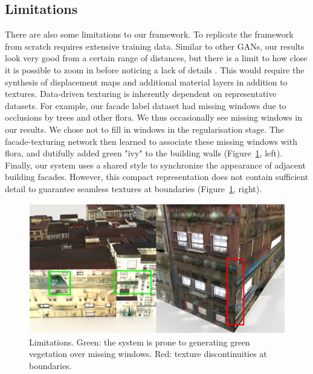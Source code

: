 \subsection{Limitations}

There are also some limitations to our framework. To replicate the framework from scratch requires extensive training data.
Similar to other GANs, our results look very good from a certain range of distances, but there is a limit to how close it is possible to zoom in before noticing a lack of details . This would require the synthesis of displacement maps and additional material layers in addition to textures. Data-driven texturing is inherently dependent on representative datasets. For example, our facade label dataset had missing windows due to occlusions by trees and other flora. We thus occasionally see missing windows in our results. We chose not to fill in windows in the regularisation stage.
The facade-texturing network then learned to associate these missing windows with flora, and dutifully added green "ivy" to the building walls (Figure~\ref{fig:limitations}, left). Finally, our system uses a shared style to synchronize the appearance of adjacent building facades. However, this compact representation does not contain sufficient detail to guarantee seamless textures at boundaries (Figure~\ref{fig:limitations}, right).

\begin{figure}[b]
    \centering
    \includegraphics[width=\columnwidth]{images/limitations.pdf}
    \caption{Limitations. Green: the system is prone to generating green vegetation over missing windows. Red: texture discontinuities at boundaries.}
    \label{fig:limitations}
\end{figure}